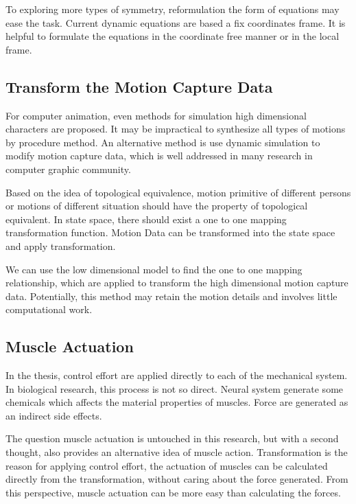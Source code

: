 To exploring more types of symmetry, reformulation the form of equations may ease the task.
Current dynamic equations are based a fix coordinates frame.
It is helpful to formulate the equations in the coordinate free manner or in the local frame.






\subsection{Transform the Motion Capture Data}
For computer animation, even methods for simulation high dimensional characters are proposed.
It may be impractical to synthesize all types of motions by procedure method.
An alternative method is use dynamic simulation to modify motion capture data, which is well addressed in many research in computer graphic community.



Based on the idea of topological equivalence, 
motion primitive of different persons or motions of different situation should have the property of topological equivalent.
In state space, there should exist a one to one mapping transformation function.
Motion Data can be transformed into the state space and apply transformation.


We can use the low dimensional model to find the one to one mapping relationship, 
which are applied to transform the high dimensional motion capture data.
Potentially, this method may retain the motion details and involves little computational work. 





\subsection{Muscle Actuation}
In the thesis, control effort are applied directly to each \dof of the mechanical system.
In biological research, this process is not so direct.
Neural system generate some chemicals which affects the material properties of muscles.
Force are generated as an indirect side effects.


The question muscle actuation is untouched in this research,
but with a second thought, \moit also provides an alternative idea of muscle action.
Transformation is the reason for applying control effort,
the actuation of muscles can be calculated directly from the transformation, without caring about the force generated.
From this perspective, muscle actuation can be more easy than calculating the forces.


